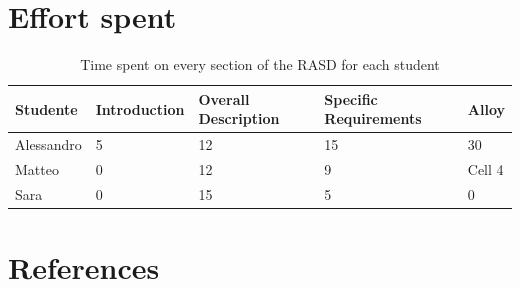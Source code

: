 \documentclass[12pt,a4paper]{article}
\begin{document}
\newpage
\tableofcontents









\section{Effort spent}
\begin{table}[h]
  \centering
  \begin{tabular}{|p{1.5cm}|p{1.5cm}|p{1.5cm}|p{1.5cm}|p{1.5cm}|}
    \hline
     Studente & Introduction & Overall Description & Specific Requirements & Alloy \\
    \hline
    Alessandro & 5 & 12 & 15 & 30 \\
    \hline
    Matteo & 0 & 12 & 9 & Cell 4 \\
    \hline
    Sara & 0 & 15 & 5 & 0 \\
    \hline
  \end{tabular}
  \caption{Time spent on every section of the RASD for each student}
  \label{tab:effort}
\end{table}

\section{References}
%
%
\end{document}

